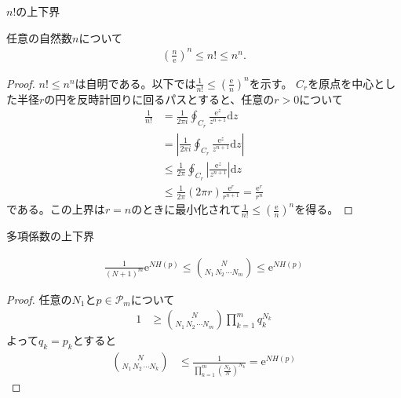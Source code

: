 \documentclass[lualatex,handout]{beamer}
\theoremstyle{definition}
\begin{document}
\begin{frame}{$n!$の上下界}
\footnotesize
\begin{lemma}
任意の自然数$n$について
\begin{align*}
\left(\frac{n}{\mathrm{e}}\right)^n\le n!\le n^n.
\end{align*}
\vspace{-1em}
\begin{proof}
$n!\le n^n$は自明である。以下では$\frac1{n!}\le \left(\frac{\mathrm{e}}{n}\right)^n$を示す。
%
$C_r$を原点を中心とした半径$r$の円を反時計回りに回るパスとすると、任意の$r>0$について
\begin{align*}
\frac1{n!} &= \frac1{2\pi i} \oint_{C_r} \frac{\mathrm{e}^z}{z^{n+1}}\mathrm{d}z\\
 &= \left|\frac1{2\pi i} \oint_{C_r} \frac{\mathrm{e}^z}{z^{n+1}}\mathrm{d}z\right|\\
&\le \frac1{2\pi } \oint_{C_r} \left|\frac{\mathrm{e}^z}{z^{n+1}}\right|\mathrm{d}z\\
&\le \frac1{2\pi } (2\pi r) \frac{\mathrm{e}^r}{r^{n+1}} = \frac{\mathrm{e}^r}{r^n}
\end{align*}
である。この上界は$r=n$のときに最小化されて$\frac1{n!}\le\left(\frac{\mathrm{e}}{n}\right)^n$を得る。
\end{proof}
\end{lemma}
\end{frame}
\fi

\begin{frame}{多項係数の上下界}
\begin{lemma}
\begin{align*}
\frac1{(N+1)^m}\mathrm{e}^{N H(p)}\le
\binom{N}{N_1\,N_2\,\dotsm N_m}
\le \mathrm{e}^{N H(p)}
\end{align*}
\end{lemma}
\begin{proof}
任意の$N_1$と$p \in\mathcal{P}_m$について
\begin{align*}
1&\ge \binom{N}{N_1\,N_2\,\dotsm N_m} \prod_{k=1}^m q_k^{N_k}
\end{align*}
よって$q_k=p_k$とすると
\begin{align*}
\binom{N}{N_1\,N_2\,\dotsm N_k}&\le \frac{1}{\prod_{k=1}^m \left(\frac{N_k}{N}\right)^{N_k}} = \mathrm{e}^{NH(p)}
\end{align*}
\end{proof}
\end{frame}
\end{document}
